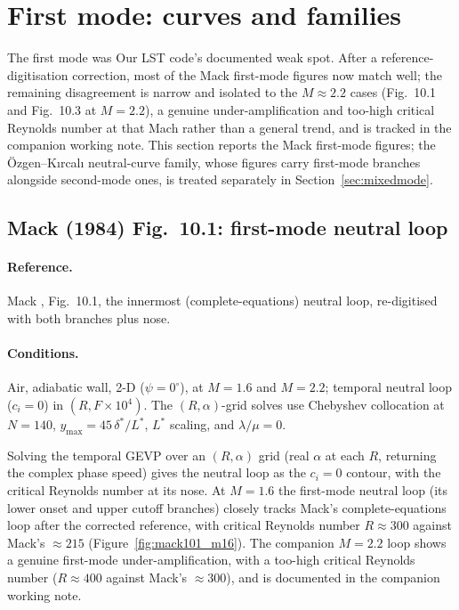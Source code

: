 \documentclass[11pt]{article}
\begin{document}
\FloatBarrier
\section{First mode: curves and families}
\label{sec:firstmode}
The first mode was Our LST code's documented weak spot. After a reference-digitisation
correction, most of the Mack first-mode figures now match well; the remaining disagreement is
narrow and isolated to the $M\approx2.2$ cases (Fig.~10.1 and Fig.~10.3 at $M=2.2$), a genuine
under-amplification and too-high critical Reynolds number at that Mach rather than a general trend,
and is tracked in the companion working note. This section reports the Mack first-mode figures;
the \"Ozgen--K{\i}rcal{\i} neutral-curve family, whose figures carry first-mode branches alongside
second-mode ones, is treated separately in Section~\ref{sec:mixedmode}.

\subsection{Mack (1984) Fig.~10.1: first-mode neutral loop}
\label{sec:mack101}

\paragraph{Reference.} Mack \cite{mack1984}, Fig.~10.1, the innermost (complete-equations) neutral
loop, re-digitised with both branches plus nose.

\paragraph{Conditions.} Air, adiabatic wall, 2-D ($\psi=0^\circ$), at $M=1.6$ and $M=2.2$;
temporal neutral loop ($c_i=0$) in $(R, F\!\times\!10^4)$. The $(R,\alpha)$-grid solves use Chebyshev
collocation at $N=140$, $y_{\max}=45\,\delta^\ast/L^\ast$, $L^\ast$ scaling, and $\lambda/\mu=0$.

Solving the temporal GEVP over an $(R,\alpha)$ grid (real $\alpha$ at each $R$, returning the
complex phase speed) gives the neutral loop as the $c_i=0$ contour, with the critical Reynolds
number at its nose. At $M=1.6$ the first-mode neutral loop (its lower onset and upper cutoff
branches) closely tracks Mack's complete-equations loop after the corrected reference, with critical
Reynolds number $R\approx300$ against Mack's $\approx215$
(Figure~\ref{fig:mack101_m16}). The companion $M=2.2$ loop shows a genuine first-mode
under-amplification, with a too-high critical Reynolds number ($R\approx400$ against Mack's
$\approx300$), and is documented in the companion working note.
\end{document}
